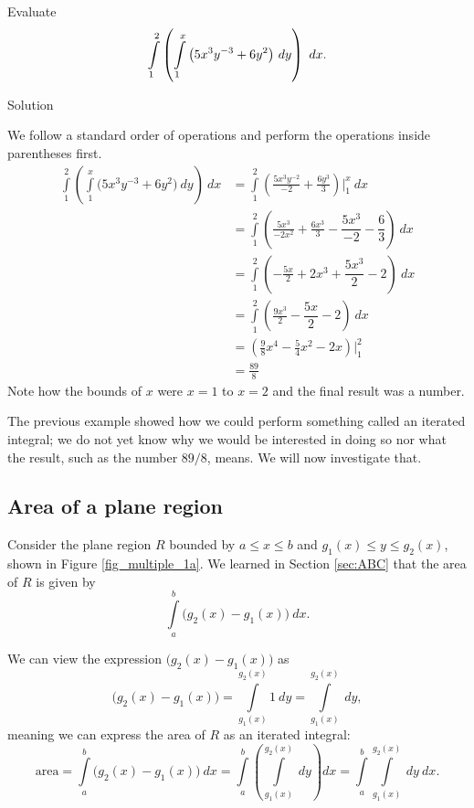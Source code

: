 \begin{example}\label{ex_iterated3}
Evaluate 
$$\ds \int\limits_1^2\left(\int\limits_1^x\big(5x^3y^{-3}+6y^2\big)\ dy\right)\ dx.$$

Solution 

We follow a standard order of operations and perform the operations inside parentheses first.
\begin{align*}
\int\limits_1^2\left(\int\limits_1^x\big(5x^3y^{-3}+6y^2\big)\ dy\right)\ dx &= \int\limits_1^2 \left(\frac{5x^3y^{-2}}{-2}+\frac{6y^3}{3}\right)\Bigg|_1^x\ dx \\
            & = \int\limits_1^2 \left(\frac{5x^3}{-2x^2}+\frac{6x^3}{3}-\dfrac{5x^3}{-2}-\dfrac{6}{3}\right)\ dx\\
            & = \int\limits_1^2 \left(-\frac{5x}{2}+2x^3+\dfrac{5x^3}{2}-2\right)\ dx\\
            & = \int\limits_1^2 \left(\frac{9x^3}{2}-\dfrac{5x}{2}-2\right)\ dx\\
			&= \left(\frac98x^4-\frac54x^2-2x\right)\Bigg|_1^2\\
			&= \frac{89}8
\end{align*}
Note how the bounds of $x$ were $x=1$ to $x=2$ and the final result was a number.
\end{example}


 

The previous example showed how we could perform something called an iterated integral; we do not yet know why we would be interested in doing so nor what the result, such as the number $89/8$, means. We will now investigate that. 

\subsection{Area of a plane region}

Consider the plane region $R$ bounded by $a\leq x\leq b$ and $g_1(x)\leq y\leq g_2(x)$, shown in Figure \ref{fig_multiple_1a}. We learned in Section \ref{sec:ABC} that the area of $R$ is given by 
$$\int\limits_a^b \big(g_2(x)-g_1(x)\big)\ dx.$$


We can  view the expression $\big(g_2(x)-g_1(x)\big)$ as 
$$\big(g_2(x)-g_1(x)\big) = \int\limits_{g_1(x)}^{g_2(x)} 1\ dy =\int\limits_{g_1(x)}^{g_2(x)} \ dy,$$
meaning we can express the area of $R$ as an iterated integral:
$$\text{area} = \int\limits_a^b \big(g_2(x)-g_1(x)\big)\ dx = \int\limits_a^b\left(\int\limits_{g_1(x)}^{g_2(x)} \ dy\right) dx =\int\limits_a^b\int\limits_{g_1(x)}^{g_2(x)} \ dy\ dx.$$

